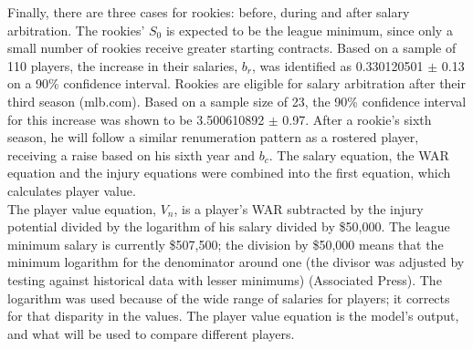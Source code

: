 \documentclass[12pt]{article}
\begin{document}
Finally, there are three cases for rookies: before, during and after salary arbitration.  The rookies' $S_0$ is expected to be the league minimum, since only a small number of rookies receive greater starting contracts.  Based on a sample of 110 players, the increase in their salaries, $b_r$, was identified as 0.330120501 $\pm$ 0.13 on a 90\% confidence interval.  Rookies are eligible for salary arbitration after their third season (mlb.com).  Based on a sample size of 23, the 90\% confidence interval for this increase was shown to be 3.500610892 $\pm$ 0.97.  After a rookie's sixth season, he will follow a similar renumeration pattern as a rostered player, receiving a raise based on his sixth year and $b_c$.  The salary equation, the WAR equation and the injury equations were combined into the first equation, which calculates player value. \\

The player value equation, $V_n$, is a player's WAR subtracted by the injury potential divided by the logarithm of his salary divided by \$50,000.  The league minimum salary is currently \$507,500; the division by \$50,000 means that the minimum logarithm for the denominator around one (the divisor was adjusted by testing against historical data with lesser minimums) (Associated Press).  The logarithm was used because of the wide range of salaries for players; it corrects for that disparity in the values.  The player value equation is the model's output, and what will be used to compare different players.  \\
\end{document}
